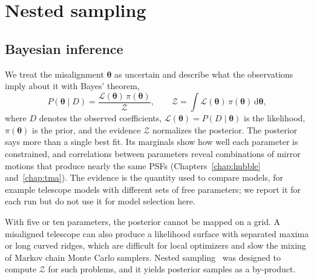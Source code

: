 \section{Nested sampling}\label{sec:nested}

\subsection{Bayesian inference}
We treat the misalignment $\boldsymbol{\theta}$ as uncertain and describe what the observations imply about it with Bayes' theorem,
\begin{equation}
P(\boldsymbol{\theta}\mid D) = \frac{\mathcal{L}(\boldsymbol{\theta})\,\pi(\boldsymbol{\theta})}{\mathcal{Z}},\qquad
\mathcal{Z} = \int \mathcal{L}(\boldsymbol{\theta})\,\pi(\boldsymbol{\theta})\,\mathrm{d}\boldsymbol{\theta},
\label{eq:bayes}
\end{equation}
where $D$ denotes the observed coefficients, $\mathcal{L}(\boldsymbol{\theta})=P(D\mid\boldsymbol{\theta})$ is the likelihood, $\pi(\boldsymbol{\theta})$ is the prior, and the evidence $\mathcal{Z}$ normalizes the posterior. The posterior says more than a single best fit. Its marginals show how well each parameter is constrained, and correlations between parameters reveal combinations of mirror motions that produce nearly the same PSFs (Chapters~\ref{chap:hubble} and~\ref{chap:tma}). The evidence is the quantity used to compare models, for example telescope models with different sets of free parameters; we report it for each run but do not use it for model selection here.

With five or ten parameters, the posterior cannot be mapped on a grid. A misaligned telescope can also produce a likelihood surface with separated maxima or long curved ridges, which are difficult for local optimizers and slow the mixing of Markov chain Monte Carlo samplers. Nested sampling~\citep{Skilling2006} was designed to compute $\mathcal{Z}$ for such problems, and it yields posterior samples as a by-product.

